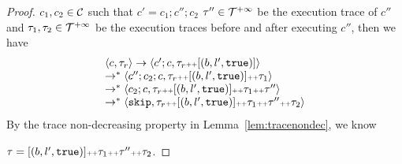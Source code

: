 \begin{proof}
$c_1, c_2 \in \mathcal{C}$ such that $c' = c_1; c''; c_2$
$\mathtt{\tau}'' \in \mathcal{T}^{+\infty}$ be the execution trace of $c''$ and $\mathtt{\tau}_1, \mathtt{\tau}_2 \in \mathcal{T}^{+\infty}$ be the execution traces before and after executing $c''$, then we have
\[
  \begin{array}{l}
  \langle c, \mathtt{\tau}_r \rangle \to \langle c';c, \mathtt{\tau}_r {\scriptscriptstyle ++} [(b, l', \mathtt{true})] \rangle \\
  \to^* \langle c'';c_2;c, \mathtt{\tau}_r {\scriptscriptstyle ++} [(b, l', \mathtt{true})] {\scriptscriptstyle ++} \mathtt{\tau}_1 \rangle \\
  \to^* \langle c_2;c, \mathtt{\tau}_r {\scriptscriptstyle ++} [(b, l', \mathtt{true})] {\scriptscriptstyle ++} \mathtt{\tau}_1 {\scriptscriptstyle ++} \mathtt{\tau}'' \rangle \\
  \to^* \langle \mathtt{skip}, \mathtt{\tau}_r {\scriptscriptstyle ++} [(b, l', \mathtt{true})] {\scriptscriptstyle ++} \mathtt{\tau}_1 {\scriptscriptstyle ++} \mathtt{\tau}'' {\scriptscriptstyle ++} \mathtt{\tau}_2 \rangle
  \end{array}
\]
By the trace non-decreasing property in Lemma~\ref{lem:tracenondec},
we know 

$\mathtt{\tau} = [(b, l', \mathtt{true})] {\scriptscriptstyle ++} \mathtt{\tau}_1 {\scriptscriptstyle ++} \mathtt{\tau}'' {\scriptscriptstyle ++} \mathtt{\tau}_2$.


\end{proof}
